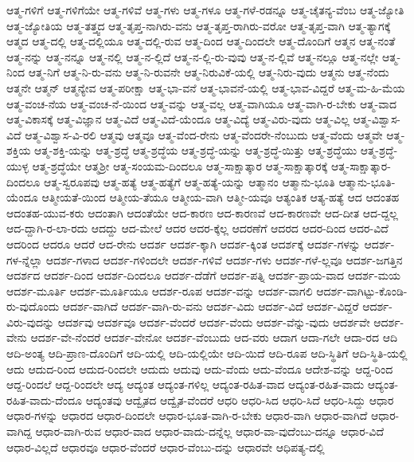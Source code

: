 {ಆತ್ಮ-ಗಳಿಗೆ
ಆತ್ಮ-ಗಳಿಗೆಯೇ
ಆತ್ಮ-ಗಳಿವೆ
ಆತ್ಮ-ಗಳು
ಆತ್ಮ-ಗಳೂ
ಆತ್ಮ-ಗಳೆ-ರಡನ್ನೂ
ಆತ್ಮ-ಚೈತನ್ಯ-ವೆಂಬ
ಆತ್ಮ-ಜ್ಯೋತಿ
ಆತ್ಮ-ಜ್ಯೋತಿಯ
ಆತ್ಮ-ತತ್ತ್ವದ
ಆತ್ಮ-ತೃಪ್ತ-ನಾಗಿರು-ವನು
ಆತ್ಮ-ತೃಪ್ತ-ರಾಗಿರು-ವರೋ
ಆತ್ಮ-ತೃಪ್ತ-ವಾಗಿ
ಆತ್ಮ-ತ್ಯಾಗಕ್ಕೆ
ಆತ್ಮದ
ಆತ್ಮ-ದಲ್ಲಿ
ಆತ್ಮ-ದಲ್ಲಿಯೂ
ಆತ್ಮ-ದಲ್ಲಿ-ರುವ
ಆತ್ಮ-ದಿಂದ
ಆತ್ಮ-ದಿಂದಲೇ
ಆತ್ಮ-ದೊಂದಿಗೆ
ಆತ್ಮನ
ಆತ್ಮ-ನಂತೆ
ಆತ್ಮ-ನನ್ನು
ಆತ್ಮ-ನನ್ನೂ
ಆತ್ಮ-ನಲ್ಲಿ
ಆತ್ಮ-ನ-ಲ್ಲಿದೆ
ಆತ್ಮ-ನ-ಲ್ಲಿ-ರು-ವುವು
ಆತ್ಮ-ನ-ಲ್ಲಿವೆ
ಆತ್ಮ-ನಲ್ಲೂ
ಆತ್ಮ-ನಲ್ಲೇ
ಆತ್ಮ-ನಿಂದ
ಆತ್ಮ-ನಿಗೆ
ಆತ್ಮ-ನಿ-ರು-ವನು
ಆತ್ಮ-ನಿ-ರುವನೇ
ಆತ್ಮ-ನಿರುವಿಕೆ-ಯಲ್ಲಿ
ಆತ್ಮ-ನಿರು-ವುದು
ಆತ್ಮನು
ಆತ್ಮ-ನೆಂದು
ಆತ್ಮನೇ
ಆತ್ಮನ್
ಆತ್ಮನ್ಯೇವ
ಆತ್ಮ-ಪರೀಕ್ಷಾ
ಆತ್ಮ-ಭಾ-ವನೆ
ಆತ್ಮ-ಭಾವನೆ-ಯಲ್ಲಿ
ಆತ್ಮ-ಭಾವ-ವಿದ್ದರೆ
ಆತ್ಮ-ಮ-ಹಿ-ಮೆಯ
ಆತ್ಮ-ವಂಚ-ನೆಯ
ಆತ್ಮ-ವಂಚ-ನೆ-ಯಿಂದ
ಆತ್ಮ-ವನ್ನು
ಆತ್ಮ-ವಲ್ಲ
ಆತ್ಮ-ವಾಗಿಯೂ
ಆತ್ಮ-ವಾಗಿ-ರ-ಬೇಕು
ಆತ್ಮ-ವಾದ
ಆತ್ಮ-ವಿಕಾಸಕ್ಕೆ
ಆತ್ಮ-ವಿಜ್ಞಾನ
ಆತ್ಮ-ವಿದೆ
ಆತ್ಮ-ವಿದೆ-ಯೆಂದೂ
ಆತ್ಮ-ವಿದ್ಯೆ
ಆತ್ಮ-ವಿರು-ವುದು
ಆತ್ಮ-ವಿಲ್ಲ
ಆತ್ಮ-ವಿಶ್ವಾಸ-ವಿದೆ
ಆತ್ಮ-ವಿಶ್ವಾಸ-ವಿ-ರಲಿ
ಆತ್ಮವು
ಆತ್ಮವೂ
ಆತ್ಮ-ವೆಂದ-ರೇನು
ಆತ್ಮ-ವೆಂದರೇ-ನೆಂಬುದು
ಆತ್ಮ-ವೆಂದು
ಆತ್ಮವೇ
ಆತ್ಮ-ಶಕ್ತಿಯ
ಆತ್ಮ-ಶಕ್ತಿ-ಯನ್ನು
ಆತ್ಮ-ಶ್ರದ್ಧೆ
ಆತ್ಮ-ಶ್ರದ್ಧೆಯ
ಆತ್ಮ-ಶ್ರದ್ಧೆ-ಯನ್ನು
ಆತ್ಮ-ಶ್ರದ್ಧೆ-ಯಿತ್ತು
ಆತ್ಮ-ಶ್ರದ್ಧೆಯು
ಆತ್ಮ-ಶ್ರದ್ಧೆ-ಯುಳ್ಳ
ಆತ್ಮ-ಶ್ರದ್ಧೆಯೇ
ಆತ್ಮಶ್ರೀ
ಆತ್ಮ-ಸಂಯಮ-ದಿಂದಲೂ
ಆತ್ಮ-ಸಾಕ್ಷಾತ್ಕಾರ
ಆತ್ಮ-ಸಾಕ್ಷಾತ್ಕಾರಕ್ಕೆ
ಆತ್ಮ-ಸಾಕ್ಷಾತ್ಕಾರ-ದಿಂದಲೂ
ಆತ್ಮ-ಸ್ವರೂಪವು
ಆತ್ಮ-ಹತ್ಯೆ
ಆತ್ಮ-ಹತ್ಯೆಗೆ
ಆತ್ಮ-ಹತ್ಯೆ-ಯನ್ನು
ಆತ್ಮಾನಂ
ಆತ್ಮಾನು-ಭೂತಿ
ಆತ್ಮಾನು-ಭೂತಿ-ಯೆಂದೂ
ಆತ್ಮೀಯತೆ-ಯಿಂದ
ಆತ್ಮೀಯ-ತೆಯೂ
ಆತ್ಮೀಯ-ವಾಗಿ
ಆತ್ಮೀ-ಯವೂ
ಆತ್ಯಂತಿಕ
ಆತ್ಯ-ಹತ್ಯೆ
ಆದ
ಆದಂತಹ
ಆದಂತಹ-ಯುವ-ಕರು
ಆದಂತಾಗಿ
ಆದಂತೆಯೇ
ಆದ-ಕಾರಣ
ಆದ-ಕಾರಣವೆ
ಆದ-ಕಾರಣವೇ
ಆದ-ದೀತ
ಆದ-ದ್ದಲ್ಲ
ಆದ-ದ್ದಾಗಿ-ರ-ಲಾ-ರದು
ಆದದ್ದು
ಆದ-ಮೇಲೆ
ಆದರ
ಆದರ-ಕ್ಕೆಲ್ಲ
ಆದರಣೆಗೆ
ಆದರದ
ಆದರ-ದಿಂದ
ಆದರ-ವಿದೆ
ಆದರಿಂದ
ಆದರೂ
ಆದರೆ
ಆದ-ರೇನು
ಆದರ್ಶ
ಆದರ್ಶ-ಕ್ಕಾಗಿ
ಆದರ್ಶ-ಕ್ಕಿಂತ
ಆದರ್ಶಕ್ಕೆ
ಆದರ್ಶ-ಗಳನ್ನು
ಆದರ್ಶ-ಗಳ-ನ್ನೆಲ್ಲಾ
ಆದರ್ಶ-ಗಳಾದ
ಆದರ್ಶ-ಗಳಿಂದಲೇ
ಆದರ್ಶ-ಗಳಿವೆ
ಆದರ್ಶ-ಗಳು
ಆದರ್ಶ-ಗಳೆ-ಲ್ಲವೂ
ಆದರ್ಶ-ಜಗತ್ತಿನ
ಆದರ್ಶದ
ಆದರ್ಶ-ದಿಂದ
ಆದರ್ಶ-ದಿಂದಲೂ
ಆದರ್ಶ-ದೆಡೆಗೆ
ಆದರ್ಶ-ಪತ್ನಿ
ಆದರ್ಶ-ಪ್ರಾಯ-ವಾದ
ಆದರ್ಶ-ಮಯ
ಆದರ್ಶ-ಮೂರ್ತಿ
ಆದರ್ಶ-ಮೂರ್ತಿಯೂ
ಆದರ್ಶ-ರೂಪ
ಆದರ್ಶ-ವನ್ನು
ಆದರ್ಶ-ವಾಗಲಿ
ಆದರ್ಶ-ವಾಗಿಟ್ಟು-ಕೊಂಡಿ-ರು-ವುದೊಂದು
ಆದರ್ಶ-ವಾಗಿದೆ
ಆದರ್ಶ-ವಾಗಿ-ರು-ವನು
ಆದರ್ಶ-ವಿದು
ಆದರ್ಶ-ವಿದೆ
ಆದರ್ಶ-ವಿದ್ದರೆ
ಆದರ್ಶ-ವಿರು-ವುದನ್ನು
ಆದರ್ಶವು
ಆದರ್ಶವೂ
ಆದರ್ಶ-ವೆಂದರೆ
ಆದರ್ಶ-ವೆಂದು
ಆದರ್ಶ-ವೆನ್ನು-ವುದು
ಆದರ್ಶವೇ
ಆದರ್ಶ-ವೇನು
ಆದರ್ಶ-ವೇ-ನೆಂದರೆ
ಆದರ್ಶ-ವೇನೋ
ಆದರ್ಶ-ವೆಂಬುದು
ಆದ-ವರು
ಆದಾಗ
ಆದಾ-ಗಲೇ
ಆದಾ-ರದ
ಆದಿ
ಆದಿ-ಅಂತ್ಯ
ಆದಿ-ಪ್ರಾಣ-ದೊಂದಿಗೆ
ಆದಿ-ಯಲ್ಲಿ
ಆದಿ-ಯಲ್ಲಿಯೇ
ಆದಿ-ಯಿದೆ
ಆದಿ-ರೂಪ
ಆದಿ-ಸ್ಥಿತಿಗೆ
ಆದಿ-ಸ್ಥಿತಿ-ಯಲ್ಲಿ
ಆದು
ಆದುದ-ರಿಂದ
ಆದುದ-ರಿಂದಲೇ
ಆದುದು
ಆದುವು
ಆದು-ವೆಂದು
ಆದು-ವೆಂದೂ
ಆದೇಶ-ವನ್ನು
ಆದ್ದ-ರಿಂದ
ಆದ್ದ-ರಿಂದಲೆ
ಆದ್ದ-ರಿಂದಲೇ
ಆದ್ಯ
ಆದ್ಯಂತ
ಆದ್ಯಂತ-ಗಳಿಲ್ಲ
ಆದ್ಯಂತ-ರಹಿತ-ವಾದ
ಆದ್ಯಂತ-ರಹಿತ-ವಾದು
ಆದ್ಯಂತ-ರಹಿತ-ವಾದು-ದೆಂದೂ
ಆದ್ಯಂತವು
ಆದ್ವೈತದ
ಆದ್ವೈತ-ವೆಂದರೆ
ಆಧರಿ
ಆಧರಿ-ಸಿದ
ಆಧರಿ-ಸಿದೆ
ಆಧರಿ-ಸಿದ್ದು
ಆಧಾರ
ಆಧಾರ-ಗಳನ್ನು
ಆಧಾರದ
ಆಧಾರ-ದಿಂದಲೇ
ಆಧಾರ-ಭೂತ-ವಾಗಿ-ರ-ಬೇಕು
ಆಧಾರ-ವಾಗಿ
ಆಧಾರ-ವಾಗಿದೆ
ಆಧಾರ-ವಾಗಿದ್ದ
ಆಧಾರ-ವಾಗಿ-ರುವ
ಆಧಾರ-ವಾದ
ಆಧಾರ-ವಾದು-ದನ್ನೆಲ್ಲ
ಆಧಾರ-ವಾ-ವುದೆಂಬು-ದನ್ನೂ
ಆಧಾರ-ವಿದೆ
ಆಧಾರ-ವಿಲ್ಲದೆ
ಆಧಾರವೂ
ಆಧಾರ-ವೆಂದರೆ
ಆಧಾರ-ವೆಂಬು-ದನ್ನು
ಆಧಾರವೇ
ಆಧಿಪತ್ಯ-ದಲ್ಲಿ
}
